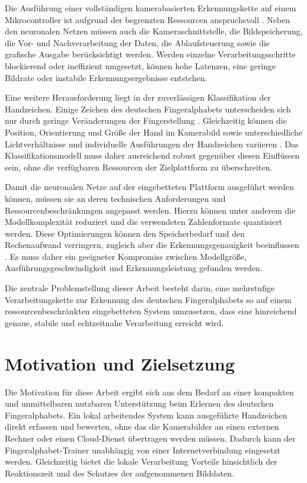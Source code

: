 Die Ausführung einer vollständigen kamerabasierten Erkennungskette auf einem Mikrocontroller ist aufgrund der begrenzten Ressourcen anspruchsvoll \cite{abadadeComprehensiveSurveyTinyML2023}. Neben den neuronalen Netzen müssen auch die Kameraschnittstelle, die Bildspeicherung, die Vor- und Nachverarbeitung der Daten, die Ablaufsteuerung sowie die grafische Ausgabe berücksichtigt werden. Werden einzelne Verarbeitungsschritte blockierend oder ineffizient umgesetzt, können hohe Latenzen, eine geringe Bildrate oder instabile Erkennungsergebnisse entstehen.

Eine weitere Herausforderung liegt in der zuverlässigen Klassifikation der Handzeichen. Einige Zeichen des deutschen Fingeralphabets unterscheiden sich nur durch geringe Veränderungen der Fingerstellung \cite{DeutscheGebaerdensprache}. Gleichzeitig können die Position, Orientierung und Größe der Hand im Kamerabild sowie unterschiedliche Lichtverhältnisse und individuelle Ausführungen der Handzeichen  variieren \cite{benitez-garciaIPNHandVideo2021}. Das Klassifikationsmodell muss daher ausreichend robust gegenüber diesen Einflüssen sein, ohne die verfügbaren Ressourcen der Zielplattform zu überschreiten.

Damit die neuronalen Netze auf der eingebetteten Plattform ausgeführt werden können, müssen sie an deren technischen Anforderungen und Ressourcenbeschränkungen angepasst werden. Hierzu können unter anderem die Modellkomplexität reduziert und die verwendeten Zahlenformate quantisiert werden. Diese Optimierungen können den Speicherbedarf und den Rechenaufwand verringern, zugleich aber die Erkennungsgenauigkeit beeinflussen \cite{jacobQuantizationTrainingNeural2018}. Es muss daher ein geeigneter Kompromiss zwischen Modellgröße, Ausführungsgeschwindigkeit und Erkennungsleistung gefunden werden.

Die zentrale Problemstellung dieser Arbeit besteht darin, eine mehrstufige Verarbeitungskette zur Erkennung des deutschen Fingeralphabets so auf einem ressourcenbeschränkten eingebetteten System umzusetzen, dass eine hinreichend genaue, stabile und echtzeitnahe Verarbeitung erreicht wird.

\section{Motivation und Zielsetzung}

Die Motivation für diese Arbeit ergibt sich aus dem Bedarf an einer kompakten und unmittelbaren nutzbaren Unterstützung beim Erlernen des deutschen Fingeralphabets. Ein lokal arbeitendes System kann ausgeführte Handzeichen direkt erfassen und bewerten, ohne das die Kamerabilder an einen externen Rechner oder einen Cloud-Dienst übertragen werden müssen. Dadurch kann der Fingeralphabet-Trainer unabhängig von einer Internetverbindung eingesetzt werden. Gleichzeitig bietet die lokale Verarbeitung Vorteile hinsichtlich der Reaktionszeit und des Schutzes der aufgenommenen Bilddaten.

